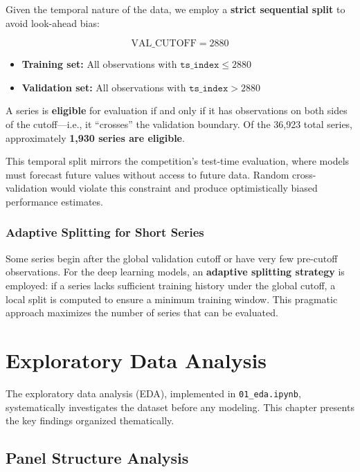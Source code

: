 Given the temporal nature of the data, we employ a \textbf{strict sequential split} to avoid look-ahead bias:

\begin{equation}
\text{VAL\_CUTOFF} = 2880
\end{equation}

\begin{itemize}
    \item \textbf{Training set:} All observations with $\texttt{ts\_index} \leq 2880$
    \item \textbf{Validation set:} All observations with $\texttt{ts\_index} > 2880$
\end{itemize}

A series is \textbf{eligible} for evaluation if and only if it has observations on both sides of the cutoff---i.e., it ``crosses'' the validation boundary. Of the 36,923 total series, approximately \textbf{1,930 series are eligible}.

This temporal split mirrors the competition's test-time evaluation, where models must forecast future values without access to future data. Random cross-validation would violate this constraint and produce optimistically biased performance estimates.

\subsection{Adaptive Splitting for Short Series}

Some series begin after the global validation cutoff or have very few pre-cutoff observations. For the deep learning models, an \textbf{adaptive splitting strategy} is employed: if a series lacks sufficient training history under the global cutoff, a local split is computed to ensure a minimum training window. This pragmatic approach maximizes the number of series that can be evaluated.


\chapter{Exploratory Data Analysis}
\label{ch:eda}

The exploratory data analysis (EDA), implemented in \texttt{01\_eda.ipynb}, systematically investigates the dataset before any modeling. This chapter presents the key findings organized thematically.

\section{Panel Structure Analysis}

